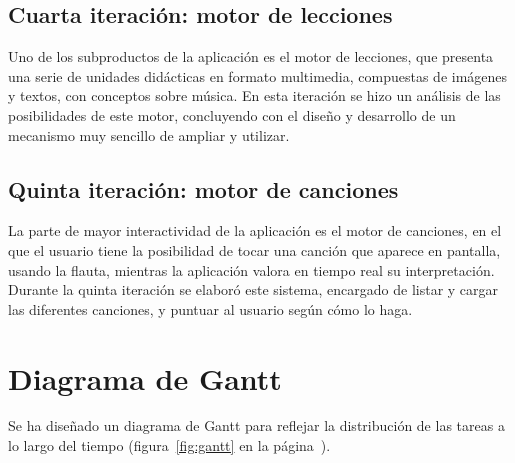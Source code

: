 \subsection{Cuarta iteración: motor de lecciones}
Uno de los subproductos de la aplicación es el motor de lecciones, que
presenta una serie de unidades didácticas en formato multimedia,
compuestas de imágenes y textos, con conceptos sobre música. En esta
iteración se hizo un análisis de las posibilidades de este motor,
concluyendo con el diseño y desarrollo de un mecanismo muy sencillo de
ampliar y utilizar.

\subsection{Quinta iteración: motor de canciones}
La parte de mayor interactividad de la aplicación es el motor de
canciones, en el que el usuario tiene la posibilidad de tocar una
canción que aparece en pantalla, usando la flauta, mientras la
aplicación valora en tiempo real su interpretación. Durante la quinta
iteración se elaboró este sistema, encargado de listar y cargar las
diferentes canciones, y puntuar al usuario según cómo lo haga.

\section{Diagrama de Gantt}
Se ha diseñado un diagrama de Gantt para reflejar la distribución de las tareas
a lo largo del tiempo (figura~\ref{fig:gantt} en la página~\pageref{fig:gantt}).

